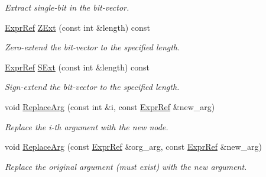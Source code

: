 \begin{DoxyCompactItemize}
\begin{DoxyCompactList}\small\item\em Extract single-\/bit in the bit-\/vector. \end{DoxyCompactList}\item 
\mbox{\label{classilang_1_1_expr_ref_a86074e888b28e1913f13e5f6f7dc98f1}} 
\mbox{\hyperlink{classilang_1_1_expr_ref}{Expr\+Ref}} \mbox{\hyperlink{classilang_1_1_expr_ref_a86074e888b28e1913f13e5f6f7dc98f1}{Z\+Ext}} (const int \&length) const
\begin{DoxyCompactList}\small\item\em Zero-\/extend the bit-\/vector to the specified length. \end{DoxyCompactList}\item 
\mbox{\label{classilang_1_1_expr_ref_a4c67d19f64c505a0160b8ec5d01fdce5}} 
\mbox{\hyperlink{classilang_1_1_expr_ref}{Expr\+Ref}} \mbox{\hyperlink{classilang_1_1_expr_ref_a4c67d19f64c505a0160b8ec5d01fdce5}{S\+Ext}} (const int \&length) const
\begin{DoxyCompactList}\small\item\em Sign-\/extend the bit-\/vector to the specified length. \end{DoxyCompactList}\item 
\mbox{\label{classilang_1_1_expr_ref_ae068c6896ea52e2e76a181a9eacfeb10}} 
void \mbox{\hyperlink{classilang_1_1_expr_ref_ae068c6896ea52e2e76a181a9eacfeb10}{Replace\+Arg}} (const int \&i, const \mbox{\hyperlink{classilang_1_1_expr_ref}{Expr\+Ref}} \&new\+\_\+arg)
\begin{DoxyCompactList}\small\item\em Replace the i-\/th argument with the new node. \end{DoxyCompactList}\item 
\mbox{\label{classilang_1_1_expr_ref_a781370d0065389f373c15c4e57cd5c1c}} 
void \mbox{\hyperlink{classilang_1_1_expr_ref_a781370d0065389f373c15c4e57cd5c1c}{Replace\+Arg}} (const \mbox{\hyperlink{classilang_1_1_expr_ref}{Expr\+Ref}} \&org\+\_\+arg, const \mbox{\hyperlink{classilang_1_1_expr_ref}{Expr\+Ref}} \&new\+\_\+arg)
\begin{DoxyCompactList}\small\item\em Replace the original argument (must exist) with the new argument. \end{DoxyCompactList}\end{DoxyCompactItemize}


